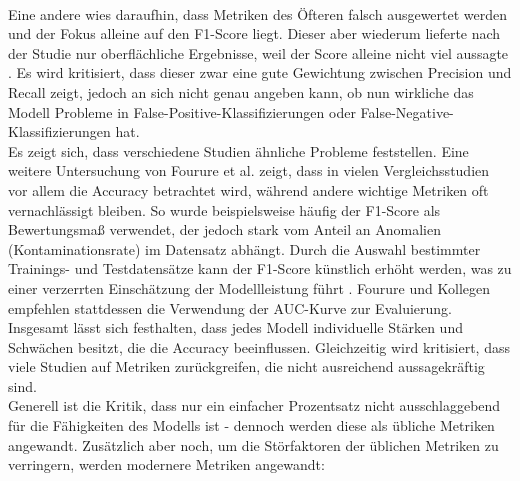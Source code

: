 \documentclass[a4paper,12pt]{article}
\begin{document}
	\\[0.5em]
	Eine andere wies daraufhin, dass Metriken des Öfteren falsch ausgewertet werden und der Fokus alleine auf den F1-Score liegt. Dieser aber wiederum lieferte nach der Studie nur oberflächliche Ergebnisse, weil der Score alleine nicht viel aussagte \cite{fourure2021anomaly}. Es wird kritisiert, dass dieser zwar eine gute Gewichtung zwischen Precision und Recall zeigt, jedoch an sich nicht genau angeben kann, ob nun wirkliche das Modell Probleme in False-Positive-Klassifizierungen oder False-Negative-Klassifizierungen hat.
	\\[0.5em]
	Es zeigt sich, dass verschiedene Studien ähnliche Probleme feststellen. Eine weitere Untersuchung von Fourure et al. zeigt, dass in vielen Vergleichsstudien vor allem die Accuracy betrachtet wird, während andere wichtige Metriken oft vernachlässigt bleiben. So wurde beispielsweise häufig der F1-Score als Bewertungsmaß verwendet, der jedoch stark vom Anteil an Anomalien (Kontaminationsrate) im Datensatz abhängt. Durch die Auswahl bestimmter Trainings- und Testdatensätze kann der F1-Score künstlich erhöht werden, was zu einer verzerrten Einschätzung der Modellleistung führt \cite{fourure2021anomaly}. Fourure und Kollegen empfehlen stattdessen die Verwendung der AUC-Kurve zur Evaluierung.
	\\[0.5em]
	Insgesamt lässt sich festhalten, dass jedes Modell individuelle Stärken und Schwächen besitzt, die die Accuracy beeinflussen. Gleichzeitig wird kritisiert, dass viele Studien auf Metriken zurückgreifen, die nicht ausreichend aussagekräftig sind.
	\\[0.5em]
	Generell ist die Kritik, dass nur ein einfacher Prozentsatz nicht ausschlaggebend für die Fähigkeiten des Modells ist - dennoch werden diese als übliche Metriken angewandt. Zusätzlich aber noch, um die Störfaktoren der üblichen Metriken zu verringern, werden modernere Metriken angewandt:
	
\end{document}
